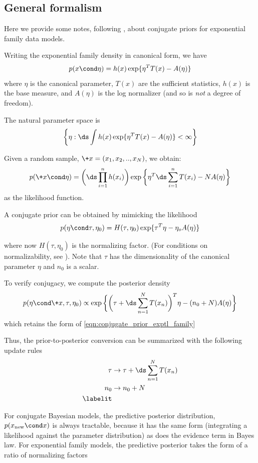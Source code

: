 \documentclass{article} %
\begin{document}
\subsection{General formalism} \label{sec:ef_general_formalism}
Here we provide some notes, following \cite{jordan_ef}, about conjugate priors for exponential family data models. 

Writing the exponential family density in canonical form, we have
\[ p(x \cond \eta) = h(x) \exp \{ \eta^T T(x) - A(\eta) \} \]
where $\eta$ is the canonical parameter, $T(x)$ are the sufficient statistics,  $h(x)$ is the base measure, and $A(\eta)$ is the log normalizer (and so is \textit{not} a degree of freedom). 

The natural parameter space is 
\[  \bigg\{\eta : \ds\int h(x) \exp \{ \eta^T T(x) - A(\eta) \} < \infty \bigg \}\]

Given a random sample, $\+x=(x_1, x_2, .., x_N)$, we obtain:
\[ p(\+x \cond \eta) = \bigg( \ds\prod_{i=1}^n h(x_i)  \bigg) \exp \bigg\{ \eta^T  \ds\sum_{i=1}^n T(x_i) - N A(\eta) \bigg\} \]
as the likelihood function.

A conjugate prior can be obtained by mimicking the likelihood
\begin{equation}
p (\eta \cond \tau, \eta_0) = H(\tau, \eta_0) \exp \{ \tau^T \eta - \eta_o A(\eta)\}
\label{eqn:conjugate_prior_exptl_family}
\end{equation}

where now $H(\tau, \eta_0)$ is the normalizing factor.  (For conditions on normalizability, see \cite{jordan}).   Note that $\tau$ has the dimensionality of the canonical parameter $\eta$ and $n_0$ is a scalar.

To verify conjugacy, we compute the posterior density
\[ p (\eta \cond \+x, \tau, \eta_0)  \propto \exp \bigg\{ \bigg( \tau + \ds\sum_{n=1}^N  T(x_n) \bigg)^T \eta - (n_0 + N) A(\eta) \bigg\} \]
which retains the form of \eqref{eqn:conjugate_prior_exptl_family}

Thus, the prior-to-posterior conversion can be summarized with the following update rules
\begin{align*}
\tau & \to \tau + \ds\sum_{n=1}^N T(x_n) \\
n_0 & \to  n_0 + N \\
\labelit \label{eqn:general_formalism_prior_to_posterior_conversion}
\end{align*}

For conjugate Bayesian models, the predictive posterior distribution, $p(x_{\text{new}} \cond x)$ is always tractable, because it has the same form (integrating a likelihood against the parameter distribution) as does the evidence term in Bayes law.   For exponential family models, the predictive posterior takes the form of a ratio of normalizing factors
\end{document}
